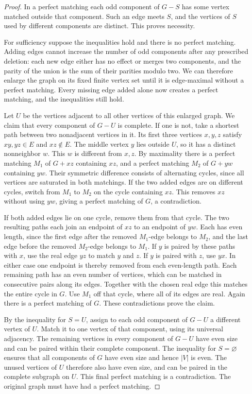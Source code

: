 \documentclass[11pt,oneside,openany]{book}
\theoremstyle{plain}
\theoremstyle{definition}
\theoremstyle{remark}
\begin{document}
\begin{proof}
In a perfect matching each odd component of \(G-S\) has some
vertex matched outside that component. Such an edge meets \(S\),
and the vertices of \(S\) used by different components are distinct.
This proves necessity.

For sufficiency suppose the inequalities hold and there is no perfect
matching. Adding edges cannot increase the number of odd components
after any prescribed deletion: each new edge either has no effect
or merges two components, and the parity of the union is the sum
of their parities modulo two. We can therefore enlarge the graph
on its fixed finite vertex set until it is edge-maximal without a
perfect matching. Every missing edge added alone now creates a
perfect matching, and the inequalities still hold.

Let \(U\) be the vertices adjacent to all other vertices of this
enlarged graph. We claim that every component of \(G-U\) is complete.
If one is not, take a shortest path between two nonadjacent
vertices in it. Its first three vertices \(x,y,z\) satisfy
\(xy,yz\in E\) and \(xz\notin E\). The middle vertex \(y\) lies
outside \(U\), so it has a distinct nonneighbor \(w\). This \(w\)
is different from \(x,z\). By maximality there is a perfect matching
\(M_1\) of \(G+xz\) containing \(xz\), and a perfect matching \(M_2\)
of \(G+yw\) containing \(yw\). Their symmetric difference consists
of alternating cycles, since all vertices are saturated in both
matchings. If the two added edges are on different cycles,
switch from \(M_1\) to \(M_2\) on the cycle containing \(xz\).
This removes \(xz\) without using \(yw\), giving a perfect matching
of \(G\), a contradiction.

If both added edges lie on one cycle, remove them from that cycle.
The two resulting paths each join an endpoint of \(xz\) to an
endpoint of \(yw\). Each has even length, since the first edge
after the removed \(M_1\)-edge belongs to \(M_2\), and the last
edge before the removed \(M_2\)-edge belongs to \(M_1\).
If \(y\) is paired by these paths with \(x\), use the real edge
\(yz\) to match \(y\) and \(z\). If \(y\) is paired with \(z\),
use \(yx\). In either case one endpoint is thereby removed from
each even-length path. Each remaining path has an even number
of vertices, which can be matched in consecutive pairs along its
edges. Together with the chosen real edge this matches the entire
cycle in \(G\). Use \(M_1\) off that cycle, where all of its edges
are real. Again there is a perfect matching of \(G\). These
contradictions prove the claim.

By the inequality for \(S=U\), assign to each odd component of
\(G-U\) a different vertex of \(U\). Match it to one vertex of
that component, using its universal adjacency. The remaining
vertices in every component of \(G-U\) have even size and can
be paired within their complete component. The inequality for
\(S=\varnothing\) ensures that all components of \(G\) have even
size and hence \(|V|\) is even. The unused vertices of \(U\)
therefore also have even size, and can be paired in the complete
subgraph on \(U\). This final perfect matching is a contradiction.
The original graph must have had a perfect matching.
\end{proof}
\end{document}
